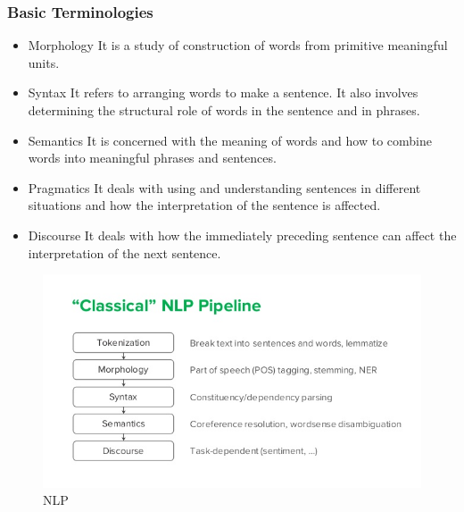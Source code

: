 \documentclass[oneside,a4paper,12pt]{book}
\begin{document}
\subsubsection{Basic Terminologies}
\begin{itemize}
    \item Morphology
    It is a study of construction of words from primitive meaningful units.
    \item Syntax
    It refers to arranging words to make a sentence. It also involves determining the structural role of words in the sentence and in phrases.
    \item Semantics
    It is concerned with the meaning of words and how to combine words into meaningful phrases and sentences.
    \item Pragmatics
    It deals with using and understanding sentences in different situations and how the interpretation of the sentence is affected.
    \item Discourse
    It deals with how the immediately preceding sentence can affect the interpretation of the next sentence.
\end{itemize}
\begin{figure}[h!]
  \centering
  \includegraphics[width=\linewidth]{nlp.png}
  \caption{NLP}
\end{figure}
\newpage
\end{document}
